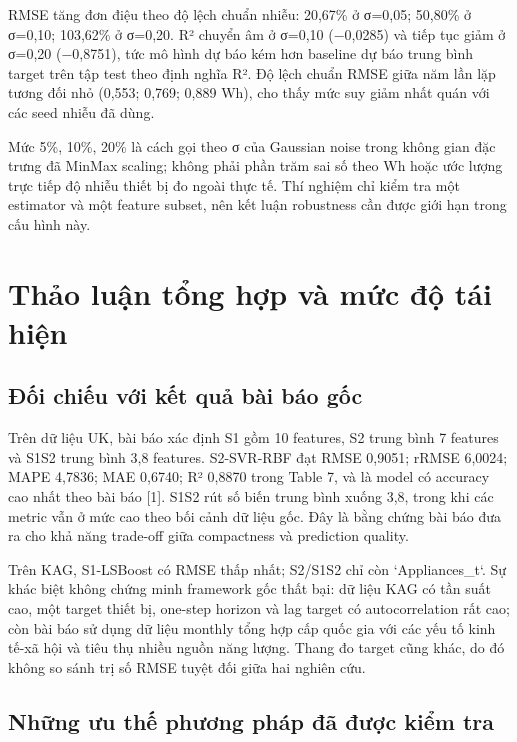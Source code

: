 RMSE tăng đơn điệu theo độ lệch chuẩn nhiễu: 20,67\% ở σ=0,05; 50,80\% ở σ=0,10; 103,62\% ở σ=0,20. R² chuyển âm ở σ=0,10 (−0,0285) và tiếp tục giảm ở σ=0,20 (−0,8751), tức mô hình dự báo kém hơn baseline dự báo trung bình target trên tập test theo định nghĩa R². Độ lệch chuẩn RMSE giữa năm lần lặp tương đối nhỏ (0,553; 0,769; 0,889 Wh), cho thấy mức suy giảm nhất quán với các seed nhiễu đã dùng.

Mức 5\%, 10\%, 20\% là cách gọi theo σ của Gaussian noise trong không gian đặc trưng đã MinMax scaling; không phải phần trăm sai số theo Wh hoặc ước lượng trực tiếp độ nhiễu thiết bị đo ngoài thực tế. Thí nghiệm chỉ kiểm tra một estimator và một feature subset, nên kết luận robustness cần được giới hạn trong cấu hình này.

\section{Thảo luận tổng hợp và mức độ tái hiện}\label{thux1ea3o-luux1eadn-tux1ed5ng-hux1ee3p-vuxe0-mux1ee9c-ux111ux1ed9-tuxe1i-hiux1ec7n}

\subsection{Đối chiếu với kết quả bài báo gốc}\label{ux111ux1ed1i-chiux1ebfu-vux1edbi-kux1ebft-quux1ea3-buxe0i-buxe1o-gux1ed1c}

Trên dữ liệu UK, bài báo xác định S1 gồm 10 features, S2 trung bình 7 features và S1S2 trung bình 3,8 features. S2-SVR-RBF đạt RMSE 0,9051; rRMSE 6,0024; MAPE 4,7836; MAE 0,6740; R² 0,8870 trong Table 7, và là model có accuracy cao nhất theo bài báo {[}1{]}. S1S2 rút số biến trung bình xuống 3,8, trong khi các metric vẫn ở mức cao theo bối cảnh dữ liệu gốc. Đây là bằng chứng bài báo đưa ra cho khả năng trade-off giữa compactness và prediction quality.

Trên KAG, S1-LSBoost có RMSE thấp nhất; S2/S1S2 chỉ còn `Appliances\_t`. Sự khác biệt không chứng minh framework gốc thất bại: dữ liệu KAG có tần suất cao, một target thiết bị, one-step horizon và lag target có autocorrelation rất cao; còn bài báo sử dụng dữ liệu monthly tổng hợp cấp quốc gia với các yếu tố kinh tế-xã hội và tiêu thụ nhiều nguồn năng lượng. Thang đo target cũng khác, do đó không so sánh trị số RMSE tuyệt đối giữa hai nghiên cứu.

\subsection{Những ưu thế phương pháp đã được kiểm tra}\label{nhux1eefng-ux1b0u-thux1ebf-phux1b0ux1a1ng-phuxe1p-ux111uxe3-ux111ux1b0ux1ee3c-kiux1ec3m-tra}

